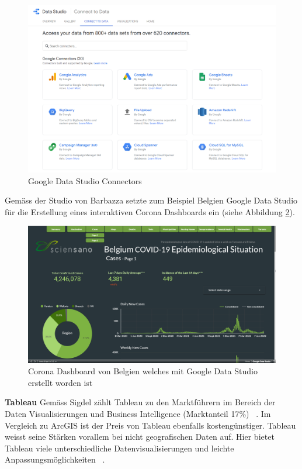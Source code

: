 \begin{figure}[h]
    \includegraphics[width=12cm]{images/google_data_studio_connectors.png}
    \centering
    \caption{Google Data Studio Connectors ~\citep{google_data_studio_connectors}}
    \label{fig:google_data_studio_connectors}
\end{figure}

\clearpage
Gemäss der Studio von Barbazza setzte zum Beispiel Belgien Google Data Studio für die Erstellung eines interaktiven Corona Dashboards ein (siehe Abbildung \ref{fig:google_data_studio_corona_dashboard}).

\begin{figure}[h]
    \includegraphics[width=12cm]{images/google_data_studio_covid_dashboard.png}
    \centering
    \caption{Corona Dashboard von Belgien welches mit Google Data Studio erstellt worden ist ~\citep{google_data_studio_corona_dashboard}}
    \label{fig:google_data_studio_corona_dashboard}
\end{figure}

\noindent
\textbf{Tableau}
\newline
\indent
Gemäss Sigdel zählt Tableau zu den Marktführern im Bereich der Daten Visualisierungen und Business Intelligence (Marktanteil 17\%) ~\citep{arcgis_comparison}. Im Vergleich zu ArcGIS ist der Preis von Tableau ebenfalls kostengünstiger. Tableau weisst seine Stärken vorallem bei nicht geografischen Daten auf. Hier bietet Tableau viele unterschiedliche Datenvisualisierungen und leichte Anpassungsmöglichkeiten ~\citep{arcgis_comparison}.

